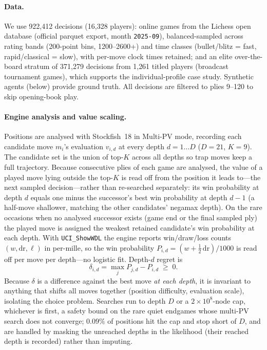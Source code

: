 \documentclass[11pt]{article}
\begin{document}
\paragraph{Data.} We use 922{,}412 decisions (16{,}328 players): online games from the
Lichess open database (official parquet export, month \texttt{2025-09}), balanced-sampled
across rating bands (200-point bins, 1200--2600+) and time classes (bullet/blitz = fast,
rapid/classical = slow), with per-move clock times retained; and an elite over-the-board
stratum of 371{,}279 decisions from 1{,}261 titled players (broadcast tournament games),
which supports the individual-profile case study. Synthetic agents (below) provide ground
truth. All decisions are filtered to plies 9--120 to skip opening-book play.

\paragraph{Engine analysis and value scaling.} Positions are analysed with Stockfish~18 in
Multi-PV mode, recording each candidate move $m_i$'s evaluation $v_{i,d}$ at every depth
$d=1\ldots D$ ($D{=}21$, $K{=}9$). The candidate set is the union of top-$K$ across all
depths so trap moves keep a full trajectory. Because consecutive plies of each game are
analysed, the value of a played move lying outside the top-$K$ is read off from the position
it leads to---the next sampled decision---rather than re-searched separately: its win
probability at depth $d$ equals one minus the successor's best win probability at depth
$d{-}1$ (a half-move shallower, matching the other candidates' negamax depth). On the rare
occasions when no analysed successor exists (game end or the final sampled ply) the played
move is assigned the weakest retained candidate's win probability at each depth. With \texttt{UCI\_ShowWDL} the engine reports win/draw/loss counts $(w,\mathrm{dr},\ell)$ in
per-mille, so the win probability $P_{i,d}=(w+\tfrac12\,\mathrm{dr})/1000$ is read off per
move per depth---no logistic fit. Depth-$d$ regret is
\begin{equation}
\delta_{i,d}=\max_j P_{j,d}-P_{i,d}\;\ge\;0 .
\end{equation}
Because $\delta$ is a difference against the best move \emph{at each depth}, it is invariant
to anything that shifts all moves together (position difficulty, evaluation scale), isolating
the choice problem. Searches run to depth $D$ or a $2\!\times\!10^{8}$-node cap, whichever is
first, a safety bound on the rare quiet endgames whose multi-PV search does not converge;
$0.09\%$ of positions hit the cap and stop short of $D$, and are handled by masking the
unreached depths in the likelihood (their reached depth is recorded) rather than imputing.
\end{document}
